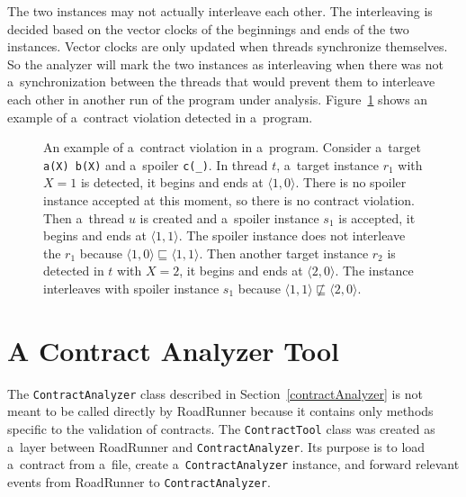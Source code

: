 The two instances may not actually interleave each other. The interleaving is
decided based on the vector clocks of the beginnings and ends of the two
instances. Vector clocks are only updated when threads synchronize themselves.
So the analyzer will mark the two instances as interleaving when there was not
a~synchronization between the threads that would prevent them to interleave each
other in another run of the program under analysis.
Figure~\ref{detectionExample} shows an example of a~contract violation detected
in a~program.

\begin{figure}[hbt]
    \begin{center}
        \label{detectionExample}
        
        \caption{An example of a~contract violation in a~program. Consider
        a~target \texttt{a(X) b(X)} and a~spoiler \texttt{c(\_)}. In thread $t$,
        a~target instance $r_1$ with $X=1$ is detected, it begins and ends at
        $\langle 1,0 \rangle$. There is no spoiler instance accepted at this
        moment, so there is no contract violation. Then a~thread $u$ is created
        and a~spoiler instance $s_1$ is accepted, it begins and ends at $\langle
        1,1 \rangle$. The spoiler instance does not interleave the $r_1$ because
        $\langle 1,0 \rangle \sqsubseteq \langle 1,1 \rangle$.  Then another
        target instance $r_2$ is detected in $t$ with $X=2$, it begins and ends
        at $\langle 2,0 \rangle$. The instance interleaves with spoiler instance
        $s_1$ because $\langle 1,1 \rangle \nsqsubseteq \langle 2,0 \rangle$.}
    \end{center}
\end{figure}

\section{A Contract Analyzer Tool}
\label{contractTool}

The \texttt{ContractAnalyzer} class described in Section~\ref{contractAnalyzer}
is not meant to be called directly by RoadRunner because it contains only
methods specific to the validation of contracts. The \texttt{ContractTool} class
was created as a~layer between RoadRunner and \texttt{ContractAnalyzer}. Its
purpose is to load a~contract from a~file, create a~\texttt{ContractAnalyzer}
instance, and forward relevant events from RoadRunner to
\texttt{ContractAnalyzer}.


